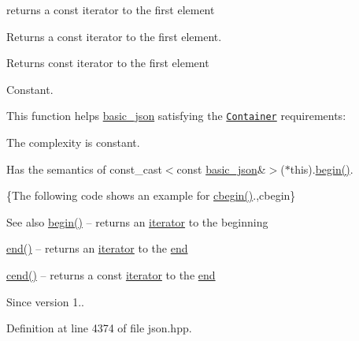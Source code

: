 returns a const iterator to the first element 

Returns a const iterator to the first element.

 \begin{DoxyReturn}{Returns}
const iterator to the first element
\end{DoxyReturn}
Constant.

This function helps {\ttfamily \hyperlink{classnlohmann_1_1basic__json}{basic\+\_\+json}} satisfying the \href{http://en.cppreference.com/w/cpp/concept/Container}{\tt Container} requirements\+:
\begin{DoxyItemize}
\item The complexity is constant.
\item Has the semantics of {\ttfamily const\+\_\+cast$<$const \hyperlink{classnlohmann_1_1basic__json}{basic\+\_\+json}\&$>$($\ast$this).\hyperlink{classnlohmann_1_1basic__json_ad4e381c54039607be08d7af41a1f6ad1}{begin()}}.
\end{DoxyItemize}

\{The following code shows an example for {\ttfamily \hyperlink{classnlohmann_1_1basic__json_aa7205e1926d3aea98adeced91b0ff5fb}{cbegin()}}.,cbegin\}

\begin{DoxySeeAlso}{See also}
\hyperlink{classnlohmann_1_1basic__json_ad4e381c54039607be08d7af41a1f6ad1}{begin()} -- returns an \hyperlink{classnlohmann_1_1basic__json_ae3c77a8f03096da2a32a3de0c317d445}{iterator} to the beginning 

\hyperlink{classnlohmann_1_1basic__json_a12ccf14d39ddae52f6c7e126105a230b}{end()} -- returns an \hyperlink{classnlohmann_1_1basic__json_ae3c77a8f03096da2a32a3de0c317d445}{iterator} to the \hyperlink{classnlohmann_1_1basic__json_a12ccf14d39ddae52f6c7e126105a230b}{end} 

\hyperlink{classnlohmann_1_1basic__json_a19dfb04c297ffb5f0ef84abfa4a5a087}{cend()} -- returns a const \hyperlink{classnlohmann_1_1basic__json_ae3c77a8f03096da2a32a3de0c317d445}{iterator} to the \hyperlink{classnlohmann_1_1basic__json_a12ccf14d39ddae52f6c7e126105a230b}{end}
\end{DoxySeeAlso}
\begin{DoxySince}{Since}
version 1.. 
\end{DoxySince}


Definition at line 4374 of file json.\+hpp.

\hypertarget{classnlohmann_1_1basic__json_a12ccf14d39ddae52f6c7e126105a230b}{}
